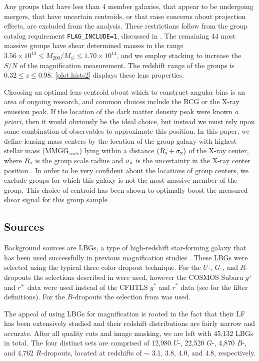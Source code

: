 Any groups that have less than 4 member galaxies, that appear to be undergoing mergers, that have uncertain centroids, or that raise concerns about projection effects, are excluded from the analysis. These restrictions follow from the group catalog requirement \texttt{FLAG\_INCLUDE=1}, discussed in \citet{George11}. The remaining $44$ most massive groups have shear determined masses in the range $ 3.56 \times 10^{13} \le M_{200} / M_\odot \le 1.70 \times 10^{14} $, and we employ stacking to increase the $S/N$ of the magnification measurement.  The redshift range of the groups is $ 0.32 \le z \le 0.98 $. \autoref{plot:hists2} displays these lens properties.

Choosing an optimal lens centroid about which to construct angular bins is an area of ongoing research, and common choices include the \acf{BCG} or the X-ray emission peak.  If the location of the dark matter density peak were known {\it a priori}, then it would obviously be the ideal choice, but instead we must rely upon some combination of observables to approximate this position.  In this paper, we define lensing mass centers by the location of the group galaxy with highest stellar mass (MMGG$_\mathrm{scale}$) lying within a distance $ (R_{\rm s} + \sigma_{\rm x}) $ of the X-ray center, where $ R_{\rm s} $ is the group scale radius and $ \sigma_{\rm x} $ is the uncertainty in the X-ray center position \citep{George11}.  In order to be very confident about the locations of group centers, we exclude groups for which this galaxy is not the most massive member of the group.  This choice of centroid has been shown to optimally boost the measured shear signal for this group sample \citep{George12}.  

\subsection{Sources}
Background sources are \ac{LBG}s, a type of high-redshift star-forming galaxy that has been used successfully in previous magnification studies \citep[see][]{Hildebrandt09b, Hildebrandt11}. These \ac{LBG}s were selected using the typical three color dropout technique. For the $U$-, $G$-, and $R$-dropouts the selections described in \citet{Hildebrandt09a} were used, however the \ac{COSMOS} Subaru $g^+$ and $r^+$ data were used instead of the \acf{CFHTLS} $g^*$ and $r^*$ data (see \citet{Capak07} for the filter definitions). For the $B$-dropouts the selection from \citet{Ouchi04} was used.  

The appeal of using \ac{LBG}s for magnification is rooted in the fact that their \acf{LF} has been extensively studied and their redshift distributions are fairly narrow and accurate.  After all quality cuts and image masking, we are left with 45,132 \ac{LBG}s in total.  The four distinct sets are comprised of 12,980 $U$-, 22,520 $G$-, 4,870 $B$-, and 4,762 $R$-dropouts, located at redshifts of $\sim$ 3.1, 3.8, 4.0, and 4.8, respectively.

